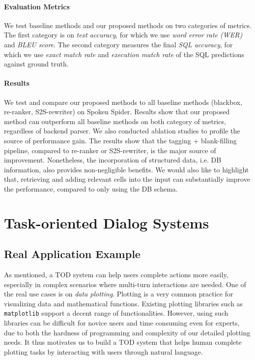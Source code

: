 \documentclass[11pt,dvipdfm]{article}
\begin{document}
\paragraph{Evaluation Metrics} We test baseline methods and our proposed methods on two categories of metrics. The first category is on \textit{text accuracy}, for which we use \textit{word error rate (WER)} and \textit{BLEU score}. The second category measures the final \textit{SQL accuracy}, for which we use \textit{exact match rate} and \textit{execution match rate} of the SQL predictions against ground truth.

\paragraph{Results}  We test and compare our proposed methods to all baseline methods (blackbox, re-ranker, S2S-rewriter) on Spoken Spider.
Results show that our proposed method can outperform all baseline methods on both category of metrics, regardless of backend parser. We also conducted ablation studies to profile the source of performance gain. The results show that the tagging + blank-filling pipeline, compared to re-ranker or S2S-rewriter, is the major source of improvement. Nonetheless, the incorporation of structured data, i.e. DB information, also provides non-negligible benefits. We would also like to highlight that, retrieving and adding relevant cells into the input can substantially improve the performance, compared to only using the DB schema.


\section{Task-oriented Dialog Systems}

\subsection{Real Application Example}
As mentioned, a TOD system can help users complete actions more easily, especially in complex scenarios where multi-turn interactions are needed.
One of the real use cases is on \textit{data plotting}.
Plotting is a very common practice for visualizing data and mathematical functions.
Existing plotting libraries such as  \texttt{matplotlib} support a decent range of functionalities. However, using such libraries can be difficult for novice users and time consuming even for experts, due to both the hardness of programming and complexity of our detailed plotting needs.
It thus motivates us to build a TOD system that helps human complete plotting tasks by interacting with users through natural language.
\end{document}
